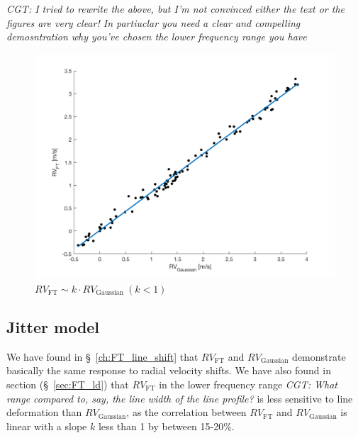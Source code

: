 {\em CGT: I tried to rewrite the above, but I'm not convinced either the text or the figures are
very clear! In partiuclar you need a clear and compelling demosntration why you've chosen the lower
frequency range you have}
\begin{figure}[htbp]
\centering
\includegraphics[width = 0.8 \linewidth]
{./Figures/Methods/5-JITTER_ONLY_1.png}
\caption[Fourier transform in response to line deformation]
{$RV_\text{FT} \sim k \cdot RV_\text{Gaussian}~(k<1)$}
\label{fig:FT_vs_Gaussian}
\end{figure} 


\subsection{Jitter model}

We have found in \S~\ref{ch:FT_line_shift} that $RV_\text{FT}$ and $RV_\text{Gaussian}$
demonstrate basically the same response to radial velocity shifts. 
We have also found in section (\S~\ref{sec:FT_ld}) that $RV_\text{FT}$ in the lower frequency range {\em CGT: What range
compared to, say, the line width of the line profile?}
is less sensitive to line deformation than $RV_\text{Gaussian}$, as the correlation between 
$RV_\text{FT}$ and $RV_\text{Gaussian}$ is linear with a slope $k$ less than 1 by between 15-20\%.


